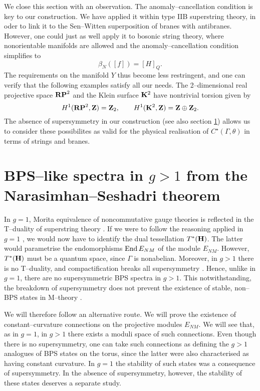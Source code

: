 \documentclass[a4paper,a4paper]{article}
\begin{document}
We close this section with an observation. The anomaly--cancellation 
condition is key to our construction. We have applied it within type 
IIB superstring theory, in oder to link it to the Sen--Witten 
superposition of branes with antibranes. However, one could just as well 
apply it to bosonic string theory, where nonorientable manifolds
are allowed and the anomaly--cancellation condition \cite{KAPUSTIN} 
simplifies to 
\begin{equation}  
\beta_N([f])=[H]_Q.  
\label{bosonicanomaly}
\end{equation}  
The requirements on the manifold $Y$ thus become less restringent,
and one can verify that the following examples satisfy all our needs.
The 2--dimensional real projective space ${\bf RP}^2$  and the Klein
surface ${\bf K}^2$ have nontrivial torsion given by
\begin{equation}
H^1({\bf RP}^2, {\bf Z})={\bf Z}_2, \qquad H^1({\bf K}^2, {\bf Z})={\bf 
Z}\oplus {\bf Z}_2.
\label{nontors}
\end{equation}
The absence of supersymmetry in our construction (see also section 
\ref{morgplus}) allows us to consider these possibilites as valid for 
the physical realisation of $C^{\star}(\Gamma, \theta)$ in terms of 
strings and branes.

\section{BPS--like spectra in $g>1$ from the Narasimhan--Seshadri theorem}
\label{morgplus}
  
In $g=1$, Morita equivalence of noncommutative gauge theories is reflected 
in the T--duality of superstring theory \cite{PIOLINE}. If we were to follow 
the reasoning applied in $g=1$ \cite{SCHWARZ}, we would now have to identify 
the dual tessellation $T^*({\bf H})$. The latter would parametrise the  
endomorphisms ${\rm End}\,E_{NM}$ of the module $E_{NM}$. However, 
$T^*({\bf H})$ must be a quantum space, since $\Gamma$ is nonabelian.
Moreover, in $g>1$ there is no T--duality, and compactification breaks 
all supersymmetry \cite{RUSSO}. Hence, unlike in $g=1$, there are no 
supersymmetric BPS spectra in $g>1$.  This notwithstanding, the breakdown 
of supersymmetry does not prevent the existence of stable, non--BPS states 
in M--theory \cite{WITTENDK, SEN}.  
 
We will therefore follow an alternative route. We will prove the existence 
of constant--curvature connections on the projective modules $E_{NM}$. We 
will see that, as in $g=1$, in $g>1$ there exists a moduli space of 
such connections. Even though there is no supersymmetry, one can take such 
connections as defining the $g>1$ analogues of BPS states on the torus, 
since the latter were also characterised as having constant curvature.
In $g=1$ the stability of such states was a consequence of supersymmetry.
In the absence of supersymmetry, however, the stability of these states deserves 
a separate study. 
\end{document}
